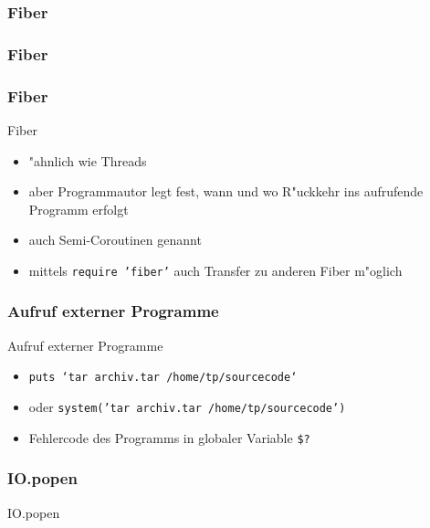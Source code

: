\documentclass{beamer}
\begin{document}
\lstset{language=Ruby}
\lstset{basicstyle=\small,numbers=none, numberstyle=\tiny, numbersep=5pt}
\begin{frame}
  \frametitle{Fiber}
  
\end{frame}

\begin{frame}
  \frametitle{Fiber}
  
\end{frame}

\begin{frame}
  \frametitle{Fiber}
  Fiber
  \begin{itemize}
    \item "ahnlich wie Threads
    \item aber Programmautor legt fest, wann und wo R"uckkehr ins aufrufende Programm erfolgt
    \item auch Semi-Coroutinen genannt
    \item mittels \texttt{require 'fiber'} auch Transfer zu anderen Fiber m"oglich
  \end{itemize}
\end{frame}


\begin{frame}
  \frametitle{Aufruf externer Programme}
  Aufruf externer Programme
  \begin{itemize}
    \item \texttt{puts `tar archiv.tar /home/tp/sourcecode`}
    \item oder \texttt{system('tar archiv.tar /home/tp/sourcecode')}
    \item Fehlercode des Programms in globaler Variable \texttt{\$?}
  \end{itemize}
\end{frame}

\begin{frame}
  \frametitle{IO.popen}
  IO.popen
  
\end{frame} 

\end{document}
